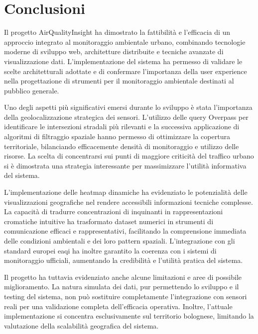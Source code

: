 \clearpage{\pagestyle{empty}\cleardoublepage}
\chapter*{Conclusioni}


Il progetto AirQualityInsight ha dimostrato la fattibilità e l'efficacia di un approccio integrato al monitoraggio
ambientale urbano, combinando tecnologie moderne di sviluppo web, architetture distribuite e tecniche avanzate
di visualizzazione dati. L'implementazione del sistema ha permesso di validare le scelte architetturali adottate e di
confermare l'importanza della user experience nella progettazione di strumenti per il monitoraggio ambientale
destinati al pubblico generale.

Uno degli aspetti più significativi emersi durante lo sviluppo è stata l'importanza della geolocalizzazione
strategica dei sensori. L'utilizzo delle query Overpass per identificare le intersezioni stradali più rilevanti e la
successiva applicazione di algoritmi di filtraggio spaziale hanno permesso di ottimizzare la copertura territoriale,
bilanciando efficacemente densità di monitoraggio e utilizzo delle risorse. La scelta di concentrarsi sui punti
di maggiore criticità del traffico urbano si è dimostrata una strategia interessante per massimizzare l'utilità
informativa del sistema.

L'implementazione delle heatmap dinamiche ha evidenziato le potenzialità delle visualizzazioni geografiche nel rendere
accessibili informazioni tecniche complesse. La capacità di tradurre concentrazioni di inquinanti in rappresentazioni
cromatiche intuitive ha trasformato dataset numerici in strumenti di comunicazione efficaci e rappresentativi,
facilitando la comprensione immediata delle condizioni ambientali e dei loro pattern spaziali. L'integrazione con gli
standard europei \acrshort{eaqi} ha inoltre garantito la coerenza con i sistemi di monitoraggio ufficiali,
aumentando la credibilità e l'utilità pratica del sistema.

Il progetto ha tuttavia evidenziato anche alcune limitazioni e aree di possibile miglioramento. La natura simulata
dei dati, pur permettendo lo sviluppo e il testing del sistema, non può sostituire completamente l'integrazione
con sensori reali per una validazione completa dell'efficacia operativa. Inoltre, l'attuale implementazione
si concentra esclusivamente sul territorio bolognese, limitando la valutazione della scalabilità geografica del sistema.

